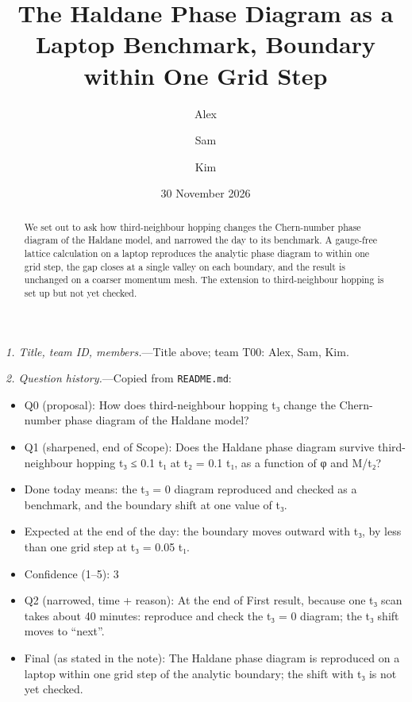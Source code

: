 \documentclass[reprint,aps,prl,superscriptaddress,amsmath,amssymb,floatfix]{revtex4-2}
\begin{document}
\title{The Haldane Phase Diagram as a Laptop Benchmark, Boundary within One Grid Step}

\author{Alex}
\author{Sam}
\author{Kim}
\date{30 November 2026}

\begin{abstract}
We set out to ask how third-neighbour hopping changes the Chern-number phase diagram of the
Haldane model, and narrowed the day to its benchmark. A gauge-free lattice calculation on a laptop
reproduces the analytic phase diagram to within one grid step, the gap closes at a single valley
on each boundary, and the result is unchanged on a coarser momentum mesh. The extension to
third-neighbour hopping is set up but not yet checked.
\end{abstract}

\maketitle

\textit{1. Title, team ID, members.}---Title above; team T00: Alex, Sam, Kim.

\textit{2. Question history.}---Copied from \texttt{README.md}:
\begin{itemize}\setlength{\itemsep}{0pt}\setlength{\parskip}{0pt}
  \item Q0 (proposal): How does third-neighbour hopping t₃ change the Chern-number phase diagram of the Haldane model?
  \item Q1 (sharpened, end of Scope): Does the Haldane phase diagram survive third-neighbour hopping t₃ ≤ 0.1 t₁ at t₂ = 0.1 t₁, as a function of φ and M/t₂?
  \item Done today means: the t₃ = 0 diagram reproduced and checked as a benchmark, and the boundary shift at one value of t₃.
  \item Expected at the end of the day: the boundary moves outward with t₃, by less than one grid step at t₃ = 0.05 t₁.
  \item Confidence (1–5): 3
  \item Q2 (narrowed, time + reason): At the end of First result, because one t₃ scan takes about 40 minutes: reproduce and check the t₃ = 0 diagram; the t₃ shift moves to ``next''.
  \item Final (as stated in the note): The Haldane phase diagram is reproduced on a laptop within one grid step of the analytic boundary; the shift with t₃ is not yet checked.
\end{itemize}
\end{document}
